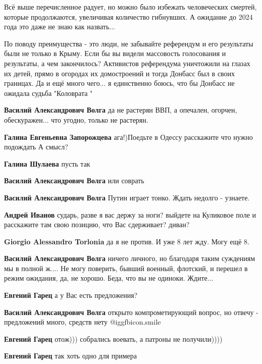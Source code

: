 \begin{itemize}
\begin{itemize}

Всё выше перечисленное радует, но можно было избежать человеческих смертей,
которые продолжаются, увеличивая количество гибнувших. А ожидание до 2024 года
это даже не знаю как назвать...

По поводу преимущества - это люди, не забывайте референдум и его результаты
были не только в Крыму. Если бы вы видели массовость голосования и результаты,
а чем закончилось? Активистов референдума уничтожили на глазах их детей, прямо
в огородах их домостроений и тогда Донбасс был в своих границах. Да и ещё много
чего... я единственно боюсь, что бы Донбасс не ожидала судьба "Коловрата "

\textbf{Василий Александрович Волга} да не растерян ВВП, а опечален, огорчен, обескуражен... что угодно, только не растерян.

\textbf{Галина Евгеньевна Запорожцева} ага!)Поедьте в Одессу расскажите что нужно подождать А смысл?

\textbf{Галина Шулаева} пусть так

\textbf{Василий Александрович Волга} или соврать

\textbf{Василий Александрович Волга} Путин играет тонко. Ждать недолго - узнаете.

\textbf{Андрей Иванов} сударь, разве я вас держу за ноги? выйдете на Куликовое поле и расскажите там свою позицию, что Вас сдерживает? диван?

\textbf{Giorgio Alessandro Torlonia} да я не против. И уже 8 лет жду. Могу ещё 8.

\textbf{Василий Александрович Волга} ничего личного, но благодаря таким суждениям мы в полной ж.... Не могу поверить, бывший военный, флотский, и перешел в режим ожидания, да, не хорошо. Беда, что вы не одиноки. Ждите...

\textbf{Евгений Гарец} а у Вас есть предложения?

\textbf{Василий Александрович Волга} открыто компрометирующий вопрос, но отвечу - предложений много, средств нету  @igg{fbicon.smile} 

\textbf{Евгений Гарец} отож))) собрались воевать, а патроны не получили))))

\textbf{Евгений Гарец} так хоть одно для примера


\end{itemize}
\end{itemize}

